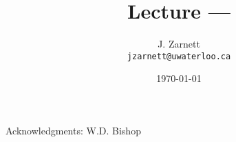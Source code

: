 

\title{Lecture  --- }

\author{J. Zarnett\\
\texttt{jzarnett@uwaterloo.ca}}
\date{\today}



\begin{frame}
  \titlepage
  
  \begin{center}
  \small{Acknowledgments: W.D. Bishop}
  \end{center}
\end{frame}





